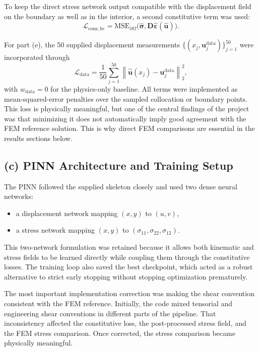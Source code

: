 \documentclass[11pt]{article}
\begin{document}
To keep the direct stress network output compatible with the displacement field on the boundary as well as in the interior, a second constitutive term was used:
\[
\mathcal{L}_{\mathrm{cons,bc}}
=
\mathrm{MSE}_{\partial\Omega}\!\big(\hat{\boldsymbol{\sigma}}, \mathbf{D}\hat{\boldsymbol{\varepsilon}}(\hat{\mathbf{u}})\big).
\]

For part (e), the 50 supplied displacement measurements \(\{(x_j,\mathbf{u}^{\mathrm{data}}_j)\}_{j=1}^{50}\) were incorporated through
\[
\mathcal{L}_{\mathrm{data}}
=
\frac{1}{50}\sum_{j=1}^{50}
\left\|
\hat{\mathbf{u}}(x_j)-\mathbf{u}^{\mathrm{data}}_j
\right\|_2^2,
\]
with \(w_{\mathrm{data}}=0\) for the physics-only baseline. All terms were implemented as mean-squared-error penalties over the sampled collocation or boundary points. This loss is physically meaningful, but one of the central findings of the project was that minimizing it does not automatically imply good agreement with the FEM reference solution. This is why direct FEM comparisons are essential in the results sections below.

\subsection*{(c) PINN Architecture and Training Setup}

The PINN followed the supplied skeleton closely and used two dense neural networks:
\begin{itemize}[itemsep=0.25em]
    \item a displacement network mapping \((x,y)\) to \((u,v)\),
    \item a stress network mapping \((x,y)\) to \((\sigma_{11}, \sigma_{22}, \sigma_{12})\).
\end{itemize}

This two-network formulation was retained because it allows both kinematic and stress fields to be learned directly while coupling them through the constitutive losses. The training loop also saved the best checkpoint, which acted as a robust alternative to strict early stopping without stopping optimization prematurely.

The most important implementation correction was making the shear convention consistent with the FEM reference. Initially, the code mixed tensorial and engineering shear conventions in different parts of the pipeline. That inconsistency affected the constitutive loss, the post-processed stress field, and the FEM stress comparison. Once corrected, the stress comparison became physically meaningful.
\end{document}
